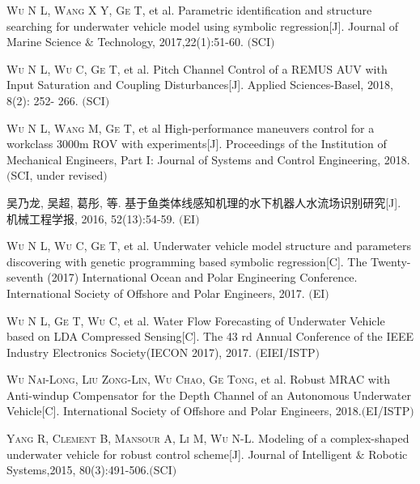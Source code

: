 
\begin{publications}{99}
    
    \item \textsc{Wu N L, Wang X Y, Ge T}, et al. {Parametric identification and structure searching for underwater vehicle model using symbolic regression}[J].  Journal of Marine Science $\&$ Technology, 2017,22(1):51-60. $($SCI$)$
    
    \item \textsc{Wu N L, Wu C, Ge T}, et al. {Pitch Channel Control of a REMUS AUV with Input Saturation and Coupling Disturbances}[J]. Applied Sciences-Basel, 2018, 8(2): 252- 266. $($SCI$)$  

    \item \textsc{Wu N L, Wang M, Ge T}, et al {High-performance maneuvers control for a workclass
	3000m ROV with experiments}[J]. Proceedings of the Institution of Mechanical Engineers, Part I: Journal of Systems and Control Engineering, 2018.$($SCI, under revised$)$
    
    \item 吴乃龙, 吴超, 葛彤, 等. {基于鱼类体线感知机理的水下机器人水流场识别研究}[J]. 机械工程学报, 2016, 52(13):54-59. $($EI$)$
    
    \item \textsc{Wu N L, Wu C, Ge T}, et al. {Underwater vehicle model structure and parameters discovering with genetic programming based
    symbolic regression}[C]. The Twenty-seventh (2017) International Ocean and Polar Engineering Conference. International Society of Offshore and Polar Engineers, 2017. $($EI$)$

    \item \textsc{Wu N L, Ge T, Wu C}, et al. {Water Flow Forecasting of Underwater Vehicle based on LDA Compressed Sensing}[C]. The 43 rd Annual Conference of the IEEE Industry Electronics Society(IECON 2017), 2017. $($EIEI/ISTP$)$

    \item \textsc{Wu Nai-Long, Liu Zong-Lin, Wu Chao, Ge Tong}, et al. {Robust MRAC with Anti-windup Compensator for the Depth Channel of an Autonomous Underwater Vehicle}[C]. International Society of Offshore and Polar Engineers, 2018.$($EI/ISTP$)$


    \item \textsc{Yang R, Clement B, Mansour A, Li M, Wu N-L}. {Modeling of a complex-shaped underwater vehicle for robust control scheme}[J]. Journal of Intelligent $\&$ Robotic Systems,2015, 80(3):491-506.$($SCI$)$    

\end{publications}


